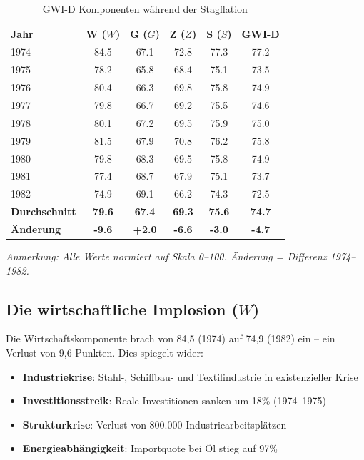 \begin{table}[ht]
    \centering
    \caption{GWI-D Komponenten während der Stagflation}
    \label{tab:gwi_stagflation}
    \begin{tabular}{lccccc}
        \toprule
        \textbf{Jahr} & \textbf{W (\(W\))} & \textbf{G (\(G\))} & \textbf{Z (\(Z\))} & \textbf{S (\(S\))} & \textbf{GWI-D} \\
        \midrule
        1974 & 84.5 & 67.1 & 72.8 & 77.3 & 77.2 \\
        1975 & 78.2 & 65.8 & 68.4 & 75.1 & 73.5 \\
        1976 & 80.4 & 66.3 & 69.8 & 75.8 & 74.9 \\
        1977 & 79.8 & 66.7 & 69.2 & 75.5 & 74.6 \\
        1978 & 80.1 & 67.2 & 69.5 & 75.9 & 75.0 \\
        1979 & 81.5 & 67.9 & 70.8 & 76.2 & 75.8 \\
        1980 & 79.8 & 68.3 & 69.5 & 75.8 & 74.9 \\
        1981 & 77.4 & 68.7 & 67.9 & 75.1 & 73.7 \\
        1982 & 74.9 & 69.1 & 66.2 & 74.3 & 72.5 \\
        \midrule
        \textbf{Durchschnitt} & \textbf{79.6} & \textbf{67.4} & \textbf{69.3} & \textbf{75.6} & \textbf{74.7} \\
        \textbf{Änderung} & \textbf{-9.6} & \textbf{+2.0} & \textbf{-6.6} & \textbf{-3.0} & \textbf{-4.7} \\
        \bottomrule
    \end{tabular}
\end{table}

\begin{flushleft}
\footnotesize{\textit{Anmerkung: Alle Werte normiert auf Skala 0–100. Änderung = Differenz 1974–1982.}}
\end{flushleft}

\subsection{Die wirtschaftliche Implosion (\(W\))}

Die Wirtschaftskomponente brach von 84,5 (1974) auf 74,9 (1982) ein – ein Verlust von 9,6 Punkten. Dies spiegelt wider:

\begin{itemize}
    \item \textbf{Industriekrise}: Stahl-, Schiffbau- und Textilindustrie in existenzieller Krise
    \item \textbf{Investitionsstreik}: Reale Investitionen sanken um 18\% (1974–1975)
    \item \textbf{Strukturkrise}: Verlust von 800.000 Industriearbeitsplätzen
    \item \textbf{Energieabhängigkeit}: Importquote bei Öl stieg auf 97\%
\end{itemize}

